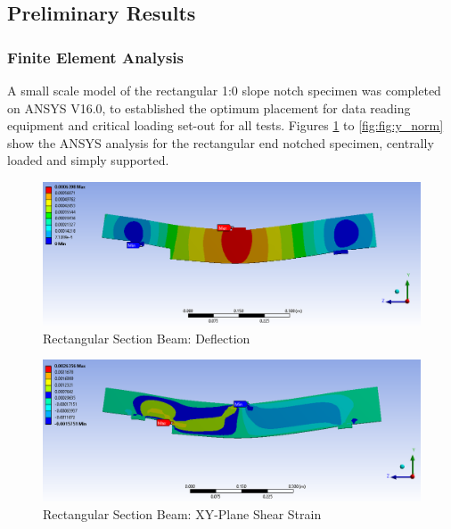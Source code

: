 \documentclass[11pt,a4paper]{article}
\numberwithin{equation}{subsection}
\begin{document}
\subsection{Preliminary Results}

\subsubsection{Finite Element Analysis}
A small scale model of the rectangular 1:0 slope notch specimen was completed on ANSYS V16.0, to established the optimum placement for data reading equipment and critical loading set-out for all tests. Figures \ref{fig:Def} to \ref{fig:fig:y_norm} show the ANSYS analysis for the rectangular end notched specimen, centrally loaded and simply supported.

\vspace*{\baselineskip}

\begin{figure}[h]
	\begin{center}
		\includegraphics[scale=0.45]{Ansys_Deflection}
	\end{center}
	
	\caption{Rectangular Section Beam: Deflection}
	\label{fig:Def}
\end{figure}

\begin{figure}[h]
	\begin{center}
		\includegraphics[scale=0.45]{YZ_shear_strain}
	\end{center}
	\caption{Rectangular Section Beam: XY-Plane Shear Strain}
	\label{fig:yz_shear}
\end{figure}
\end{document}
